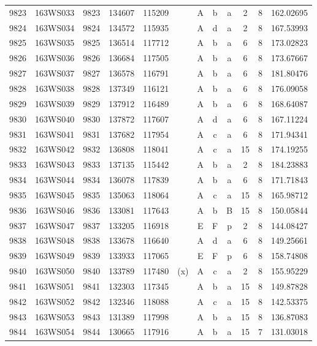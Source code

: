 \begin{tabular}{|*{12}{c|}}
9823 & 163WS033 & 9823 & 134607 & 115209 &  & A & b & a & 2 & 8 & 162.02695 \\ 
9824 & 163WS034 & 9824 & 134572 & 115935 &  & A & d & a & 2 & 8 & 167.53993 \\ 
9825 & 163WS035 & 9825 & 136514 & 117712 &  & A & b & a & 6 & 8 & 173.02823 \\ 
9826 & 163WS036 & 9826 & 136684 & 117505 &  & A & b & a & 6 & 8 & 173.67667 \\ 
9827 & 163WS037 & 9827 & 136578 & 116791 &  & A & b & a & 6 & 8 & 181.80476 \\ 
9828 & 163WS038 & 9828 & 137349 & 116121 &  & A & b & a & 6 & 8 & 176.09058 \\ 
9829 & 163WS039 & 9829 & 137912 & 116489 &  & A & b & a & 6 & 8 & 168.64087 \\ 
9830 & 163WS040 & 9830 & 137872 & 117607 &  & A & d & a & 6 & 8 & 167.11224 \\ 
9831 & 163WS041 & 9831 & 137682 & 117954 &  & A & c & a & 6 & 8 & 171.94341 \\ 
9832 & 163WS042 & 9832 & 136808 & 118041 &  & A & c & a & 15 & 8 & 174.19255 \\ 
9833 & 163WS043 & 9833 & 137135 & 115442 &  & A & b & a & 2 & 8 & 184.23883 \\ 
9834 & 163WS044 & 9834 & 136078 & 117839 &  & A & b & a & 6 & 8 & 171.71843 \\ 
9835 & 163WS045 & 9835 & 135063 & 118064 &  & A & c & a & 15 & 8 & 165.98712 \\ 
9836 & 163WS046 & 9836 & 133081 & 117643 &  & A & b & B & 15 & 8 & 150.05844 \\ 
9837 & 163WS047 & 9837 & 133205 & 116918 &  & E & F & p & 2 & 8 & 144.08427 \\ 
9838 & 163WS048 & 9838 & 133678 & 116640 &  & A & d & a & 6 & 8 & 149.25661 \\ 
9839 & 163WS049 & 9839 & 133933 & 117065 &  & E & F & p & 6 & 8 & 158.74808 \\ 
9840 & 163WS050 & 9840 & 133789 & 117480 & (x) & A & c & a & 2 & 8 & 155.95229 \\ 
9841 & 163WS051 & 9841 & 132303 & 117345 &  & A & b & a & 15 & 8 & 149.87828 \\ 
9842 & 163WS052 & 9842 & 132346 & 118088 &  & A & c & a & 15 & 8 & 142.53375 \\ 
9843 & 163WS053 & 9843 & 131389 & 117998 &  & A & b & a & 15 & 8 & 136.87083 \\ 
9844 & 163WS054 & 9844 & 130665 & 117916 &  & A & b & a & 15 & 7 & 131.03018 \\ 

\end{tabular}
